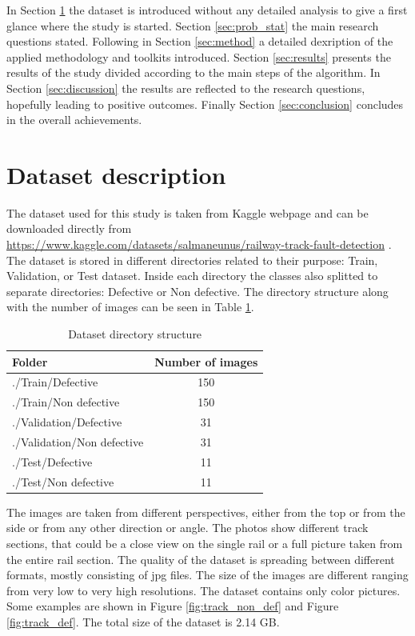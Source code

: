 \documentclass[10pt, final]{article}
\begin{document}
In Section \ref{sec:data_desc} the dataset is introduced without any detailed analysis
to give a first glance where the study is started.
Section \ref{sec:prob_stat} the main research questions stated.
Following in Section \ref{sec:method} a detailed dexription of the applied methodology
and toolkits introduced.
Section \ref{sec:results} presents the results of the study divided according to
the main steps of the algorithm.
In Section \ref{sec:discussion} the results are reflected to the research questions,
hopefully leading to positive outcomes.
Finally Section \ref{sec:conclusion} concludes in the overall achievements.

\section{Dataset description} \label{sec:data_desc}
The dataset used for this study is taken from Kaggle webpage \cite{noauthor_kaggle_nodate}
and can be downloaded directly from
\url{https://www.kaggle.com/datasets/salmaneunus/railway-track-fault-detection}
\cite{noauthor_railway_nodate}.
The dataset is stored in different directories related to their purpose: Train, Validation,
or Test dataset.
Inside each directory the classes also splitted to separate directories: Defective or Non defective.
The directory structure along with the number of images can be seen in Table \ref{table:dir_struct}.

\begin{table}[!ht]
	\centering
	\begin{tabular}{l c}
		Folder                     & Number of images \\
		\hline
		./Train/Defective          & 150              \\
		./Train/Non defective      & 150              \\
		./Validation/Defective     & 31               \\
		./Validation/Non defective & 31               \\
		./Test/Defective           & 11               \\
		./Test/Non defective       & 11               \\
		\hline
	\end{tabular}
	\caption{Dataset directory structure}
	\label{table:dir_struct}
\end{table}

The images are taken from different perspectives, either from the top or from the side or from
any other direction or angle.
The photos show different track sections, that could be a close view on the single rail or
a full picture taken from the entire rail section.
The quality of the dataset is spreading between different formats, mostly consisting of jpg files.
The size of the images are different ranging from very low to very high resolutions.
The dataset contains only color pictures.
Some examples are shown in Figure \ref{fig:track_non_def} and Figure \ref{fig:track_def}.
The total size of the dataset is 2.14 GB.
\end{document}
